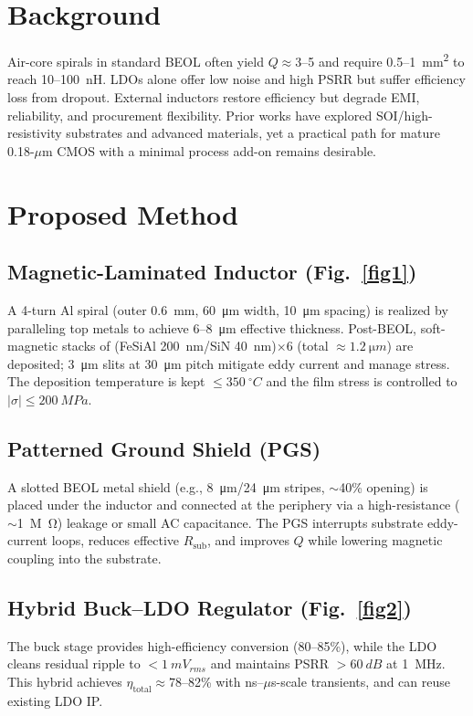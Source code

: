 \documentclass[journal]{IEEEtran}
\begin{document}
\section{Background}
Air-core spirals in standard BEOL often yield $Q\!\approx\!3$--5 and require \SI{0.5}{}--\SI{1}{mm^2} to reach \SI{10}{}--\SI{100}{nH}. LDOs alone offer low noise and high PSRR but suffer efficiency loss from dropout. External inductors restore efficiency but degrade EMI, reliability, and procurement flexibility. Prior works have explored SOI/high-resistivity substrates and advanced materials, yet a practical path for mature 0.18-\mbox{$\mu$m} CMOS with a minimal process add-on remains desirable.

\section{Proposed Method}
\subsection{Magnetic-Laminated Inductor (Fig.~\ref{fig1})}
A 4-turn Al spiral (outer \SI{0.6}{mm}, \SI{60}{\micro m} width, \SI{10}{\micro m} spacing) is realized by paralleling top metals to achieve \SI{6}{}--\SI{8}{\micro m} effective thickness. Post-BEOL, soft-magnetic stacks of (FeSiAl \SI{200}{nm}/SiN \SI{40}{nm})$\times 6$ (total $\approx\SI{1.2}{\micro m}$) are deposited; \SI{3}{\micro m} slits at \SI{30}{\micro m} pitch mitigate eddy current and manage stress. The deposition temperature is kept $\le\SI{350}{^\circ C}$ and the film stress is controlled to $|\sigma|\le\SI{200}{MPa}$.

\subsection{Patterned Ground Shield (PGS)}
A slotted BEOL metal shield (e.g., \SI{8}{\micro m}/\SI{24}{\micro m} stripes, $\sim$40\% opening) is placed under the inductor and connected at the periphery via a high-resistance (\(\sim\)\SI{1}{M\ohm}) leakage or small AC capacitance. The PGS interrupts substrate eddy-current loops, reduces effective $R_\mathrm{sub}$, and improves $Q$ while lowering magnetic coupling into the substrate.

\subsection{Hybrid Buck--LDO Regulator (Fig.~\ref{fig2})}
The buck stage provides high-efficiency conversion (80--85\%), while the LDO cleans residual ripple to $<\SI{1}{mV_{rms}}$ and maintains PSRR $>\SI{60}{dB}$ at \SI{1}{MHz}. This hybrid achieves $\eta_\mathrm{total}\approx78$--82\% with ns--\(\mu\)s-scale transients, and can reuse existing LDO IP.
\end{document}
